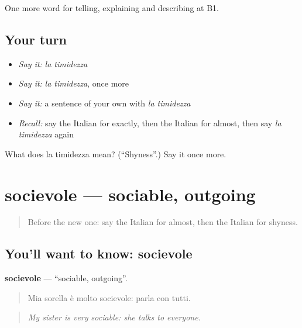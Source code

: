 \begin{grammarlens}[title={What you've built}]
One more word for telling, explaining and describing at B1.
\end{grammarlens}

\subsection*{Your turn}
\begin{itemize}
\raggedright
  \item \emph{Say it:} \emph{la timidezza}
  \item \emph{Say it:} \emph{la timidezza}, once more
  \item \emph{Say it:} a sentence of your own with \emph{la timidezza}
  \item \emph{Recall:} say the Italian for exactly, then the Italian for almost, then say \emph{la timidezza} again
\end{itemize}

\begin{tcolorbox}[breakable,colback=teal!4,colframe=teal!35!black,title={Before you move on}]
What does la timidezza mean? (\textquotedblleft{}Shyness\textquotedblright{}.) Say it once more.
\end{tcolorbox}
\section[socievole]{socievole — sociable, outgoing}

\label{lesson:IT-C471-socievole}



\begin{quote}
Before the new one: say the Italian for almost, then the Italian for shyness.
\end{quote}

\subsection*{You'll want to know: socievole}
\textbf{socievole} — \textquotedblleft{}sociable, outgoing\textquotedblright{}.

\begin{quote}
Mia sorella è molto socievole: parla con tutti.
\end{quote}

\begin{quote}
\emph{My sister is very sociable: she talks to everyone.}
\end{quote}


